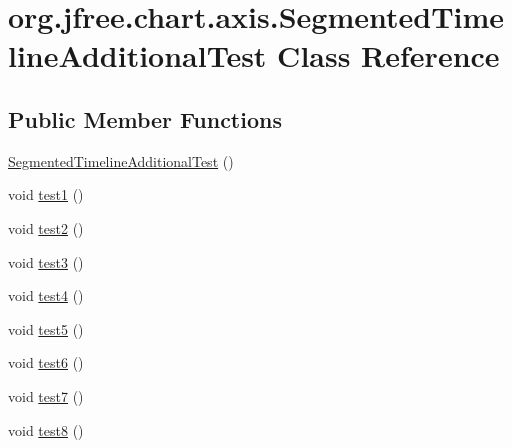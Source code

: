 \hypertarget{classorg_1_1jfree_1_1chart_1_1axis_1_1_segmented_timeline_additional_test}{}\section{org.\+jfree.\+chart.\+axis.\+Segmented\+Timeline\+Additional\+Test Class Reference}
\label{classorg_1_1jfree_1_1chart_1_1axis_1_1_segmented_timeline_additional_test}
\subsection*{Public Member Functions}
\begin{DoxyCompactItemize}
\item 
\mbox{\hyperlink{classorg_1_1jfree_1_1chart_1_1axis_1_1_segmented_timeline_additional_test_a813f534bb4e0c3340fbf8f63671c8d6e}{Segmented\+Timeline\+Additional\+Test}} ()
\item 
void \mbox{\hyperlink{classorg_1_1jfree_1_1chart_1_1axis_1_1_segmented_timeline_additional_test_afeeec91053b296cd2a770fb7f05a4e48}{test1}} ()
\item 
void \mbox{\hyperlink{classorg_1_1jfree_1_1chart_1_1axis_1_1_segmented_timeline_additional_test_aa761c9389ebf38be848a8963352669f3}{test2}} ()
\item 
void \mbox{\hyperlink{classorg_1_1jfree_1_1chart_1_1axis_1_1_segmented_timeline_additional_test_aab9c46eee14401b8d7dcf5166c95b988}{test3}} ()
\item 
void \mbox{\hyperlink{classorg_1_1jfree_1_1chart_1_1axis_1_1_segmented_timeline_additional_test_a30bfdb84b2a41881927c02f2815267a8}{test4}} ()
\item 
void \mbox{\hyperlink{classorg_1_1jfree_1_1chart_1_1axis_1_1_segmented_timeline_additional_test_a9d5d7f40cf9f3a8f9ae824006a71cb2e}{test5}} ()
\item 
void \mbox{\hyperlink{classorg_1_1jfree_1_1chart_1_1axis_1_1_segmented_timeline_additional_test_a24a52edc574004611d981bb9b07bbddb}{test6}} ()
\item 
void \mbox{\hyperlink{classorg_1_1jfree_1_1chart_1_1axis_1_1_segmented_timeline_additional_test_a724c9313080f43782a3845405eaf68f4}{test7}} ()
\item 
void \mbox{\hyperlink{classorg_1_1jfree_1_1chart_1_1axis_1_1_segmented_timeline_additional_test_a654a0ac31e56f57d0a672dedc0e4f478}{test8}} ()
\end{DoxyCompactItemize}


